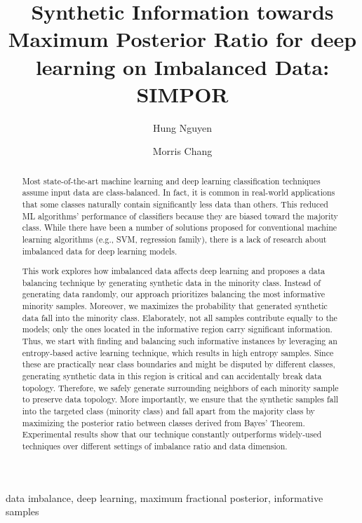\documentclass[final,5p,times, twocolumn]{elsarticle}
\newcommand{\MethodnameLong}{Synthetic Information towards Maximum Posterior Ratio}
\newcommand{\Methodname}{SIMPOR}
\begin{document}
	
	
	\begin{frontmatter}
	
	\title{ \MethodnameLong{} for deep learning on Imbalanced Data: \Methodname{}\\}
	

	\author[add1]{Hung Nguyen}
	
	\author[add1]{Morris Chang}
	
	\address[add1]{University of South Florida, USA}

	
	
	\thispagestyle{plain}
	\pagestyle{plain}
	
	\begin{abstract}
		Most state-of-the-art machine learning and deep learning classification techniques assume input data are class-balanced. In fact, it is common in real-world applications that some classes naturally contain significantly less data than others. This reduced ML algorithms' performance of classifiers because they are biased toward the majority class. While there have been a number of solutions proposed for conventional machine learning algorithms (e.g., SVM, regression family), there is a lack of research about imbalanced data for deep learning models. 
		
		This work explores how imbalanced data affects deep learning and proposes a data balancing technique by generating synthetic data in the minority class. Instead of generating data randomly, our approach prioritizes balancing the most informative minority samples. Moreover, we maximizes the probability that generated synthetic data fall into the minority class. Elaborately, not all samples contribute equally to the models; only the ones located in the informative region carry significant information. Thus, we start with finding and balancing such informative instances by leveraging an entropy-based active learning technique, which results in high entropy samples. Since these are practically near class boundaries and might be disputed by different classes, generating synthetic data in this region is critical and can accidentally break data topology. Therefore, we safely generate surrounding neighbors of each minority sample to preserve data topology. More importantly, we ensure that the synthetic samples fall into the targeted class (minority class) and fall apart from the majority class by maximizing the posterior ratio between classes derived from Bayes' Theorem. Experimental results show that our technique constantly outperforms widely-used techniques over different settings of imbalance ratio and data dimension.
		
	\end{abstract}
	
	\begin{keyword}
		data imbalance, deep learning, maximum fractional posterior, informative samples  
	\end{keyword}
	
\end{frontmatter}
\end{document}
